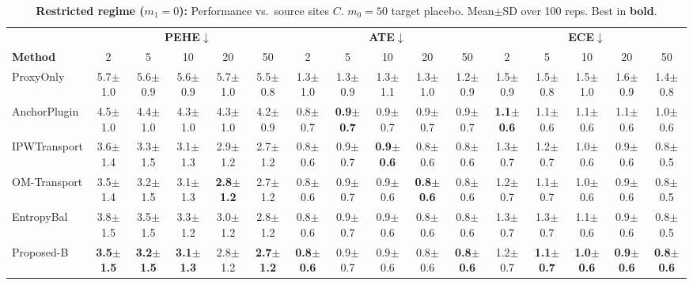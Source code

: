 \begin{table}[t]
\centering
\tiny
\setlength{\tabcolsep}{1.5pt}
\renewcommand{\arraystretch}{1.1}
\begin{tabular}{@{}l|ccccc|ccccc|ccccc@{}}
\hline
& \multicolumn{5}{c|}{\textbf{PEHE$\downarrow$}} & \multicolumn{5}{c|}{\textbf{ATE$\downarrow$}} & \multicolumn{5}{c}{\textbf{ECE$\downarrow$}} \\
\textbf{Method} & 2 & 5 & 10 & 20 & 50 & 2 & 5 & 10 & 20 & 50 & 2 & 5 & 10 & 20 & 50 \\
\hline
ProxyOnly & 5.7{\tiny$\pm$1.0} & 5.6{\tiny$\pm$0.9} & 5.6{\tiny$\pm$0.9} & 5.7{\tiny$\pm$1.0} & 5.5{\tiny$\pm$0.8} & 1.3{\tiny$\pm$1.0} & 1.3{\tiny$\pm$0.9} & 1.3{\tiny$\pm$1.1} & 1.3{\tiny$\pm$1.0} & 1.2{\tiny$\pm$0.9} & 1.5{\tiny$\pm$0.9} & 1.5{\tiny$\pm$0.8} & 1.5{\tiny$\pm$1.0} & 1.6{\tiny$\pm$0.9} & 1.4{\tiny$\pm$0.8} \\
AnchorPlugin & 4.5{\tiny$\pm$1.0} & 4.4{\tiny$\pm$1.0} & 4.3{\tiny$\pm$1.0} & 4.3{\tiny$\pm$1.0} & 4.2{\tiny$\pm$0.9} & 0.8{\tiny$\pm$0.7} & \textbf{0.9{\tiny$\pm$0.7}} & 0.9{\tiny$\pm$0.7} & 0.9{\tiny$\pm$0.7} & 0.9{\tiny$\pm$0.7} & \textbf{1.1{\tiny$\pm$0.6}} & 1.1{\tiny$\pm$0.6} & 1.1{\tiny$\pm$0.6} & 1.1{\tiny$\pm$0.6} & 1.0{\tiny$\pm$0.6} \\
IPWTransport & 3.6{\tiny$\pm$1.4} & 3.3{\tiny$\pm$1.5} & 3.1{\tiny$\pm$1.3} & 2.9{\tiny$\pm$1.2} & 2.7{\tiny$\pm$1.2} & 0.8{\tiny$\pm$0.6} & 0.9{\tiny$\pm$0.7} & \textbf{0.9{\tiny$\pm$0.6}} & 0.8{\tiny$\pm$0.6} & 0.8{\tiny$\pm$0.6} & 1.3{\tiny$\pm$0.7} & 1.2{\tiny$\pm$0.7} & 1.0{\tiny$\pm$0.6} & 0.9{\tiny$\pm$0.6} & 0.8{\tiny$\pm$0.5} \\
OM-Transport & 3.5{\tiny$\pm$1.4} & 3.2{\tiny$\pm$1.5} & 3.1{\tiny$\pm$1.3} & \textbf{2.8{\tiny$\pm$1.2}} & 2.7{\tiny$\pm$1.2} & 0.8{\tiny$\pm$0.6} & 0.9{\tiny$\pm$0.7} & 0.9{\tiny$\pm$0.6} & \textbf{0.8{\tiny$\pm$0.6}} & 0.8{\tiny$\pm$0.6} & 1.2{\tiny$\pm$0.7} & 1.1{\tiny$\pm$0.7} & 1.0{\tiny$\pm$0.6} & 0.9{\tiny$\pm$0.6} & 0.8{\tiny$\pm$0.5} \\
EntropyBal & 3.8{\tiny$\pm$1.5} & 3.5{\tiny$\pm$1.5} & 3.3{\tiny$\pm$1.2} & 3.0{\tiny$\pm$1.2} & 2.8{\tiny$\pm$1.2} & 0.8{\tiny$\pm$0.6} & 0.9{\tiny$\pm$0.7} & 0.9{\tiny$\pm$0.6} & 0.8{\tiny$\pm$0.6} & 0.8{\tiny$\pm$0.6} & 1.3{\tiny$\pm$0.7} & 1.3{\tiny$\pm$0.7} & 1.1{\tiny$\pm$0.6} & 0.9{\tiny$\pm$0.6} & 0.8{\tiny$\pm$0.5} \\
Proposed-B & \textbf{3.5{\tiny$\pm$1.5}} & \textbf{3.2{\tiny$\pm$1.5}} & \textbf{3.1{\tiny$\pm$1.3}} & 2.8{\tiny$\pm$1.2} & \textbf{2.7{\tiny$\pm$1.2}} & \textbf{0.8{\tiny$\pm$0.6}} & 0.9{\tiny$\pm$0.7} & 0.9{\tiny$\pm$0.6} & 0.8{\tiny$\pm$0.6} & \textbf{0.8{\tiny$\pm$0.6}} & 1.2{\tiny$\pm$0.7} & \textbf{1.1{\tiny$\pm$0.7}} & \textbf{1.0{\tiny$\pm$0.6}} & \textbf{0.9{\tiny$\pm$0.6}} & \textbf{0.8{\tiny$\pm$0.6}} \\
\hline
\end{tabular}
\caption{
\textbf{Restricted regime ($m_1=0$):} Performance vs.\ source sites $C$.
$m_0=50$ target placebo. Mean{\tiny$\pm$SD} over 100 reps. Best in \textbf{bold}.
}
\label{tab:restricted-m10}
\end{table}